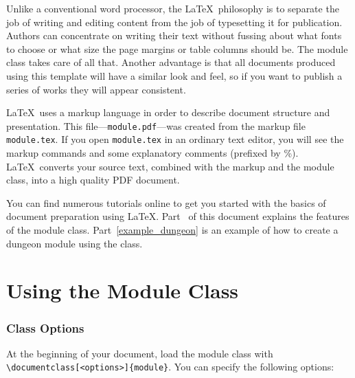 \documentclass[a4paper,serif]{module}
\begin{document}
Unlike a conventional word processor, the \LaTeX~philosophy is to separate the job of writing and editing content
from the job of typesetting it for publication. Authors can concentrate on writing their text without fussing
about what fonts to choose or what size the page margins or table columns should be. The module class takes care
of all that. Another advantage is that all documents produced using this template will have a similar look and
feel, so if you want to publish a series of works they will appear consistent.

\LaTeX~uses a markup language in order to describe document structure and presentation. This
file---\verb|module.pdf|---was created from the markup file \verb|module.tex|. If you open \verb|module.tex|
in an ordinary text editor, you will see the markup commands and some explanatory comments (prefixed by \%).
\LaTeX~converts your source text, combined with the markup and the module class, into a high quality PDF document.

You can find numerous tutorials online to get you started with the basics of document preparation using \LaTeX.
Part~\ref{using_the_module_class} of this document explains the features of the module class. Part~\ref{example_dungeon}
is an example of how to create a dungeon module using the class.

\part{Using the Module Class}
\label{using_the_module_class}

\section{Class Options}

At the beginning of your document, load the module class with \verb|\documentclass[<options>]{module}|. You can
specify the following options:
\end{document}
